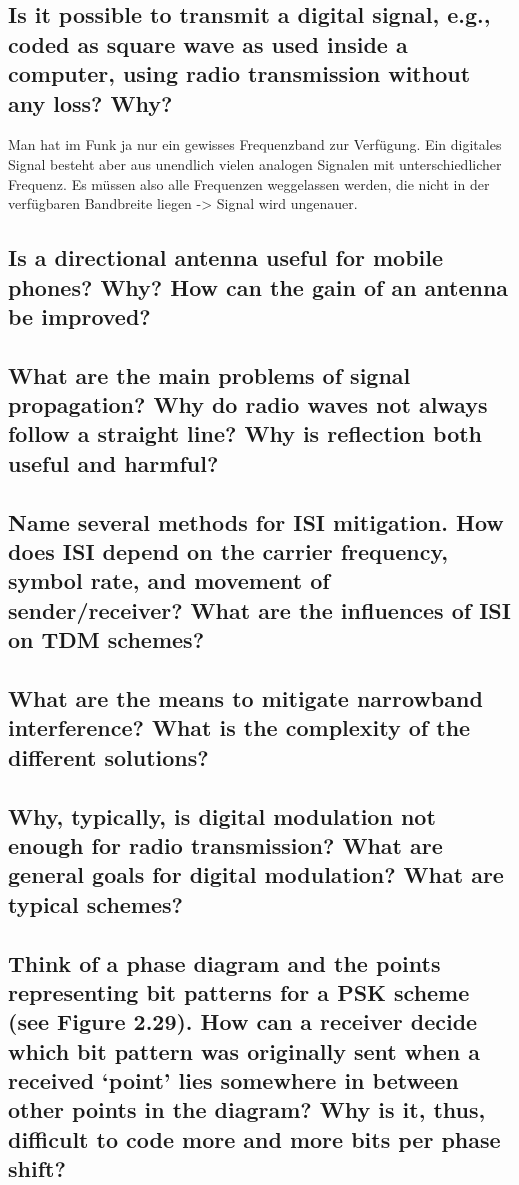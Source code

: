 \subsection{Is it possible to transmit a digital signal, e.g., coded as square wave as used inside a
computer, using radio transmission without any loss? Why?}
Man hat im Funk ja nur ein gewisses Frequenzband zur Verfügung. Ein digitales Signal besteht aber aus unendlich vielen analogen Signalen mit unterschiedlicher Frequenz. Es müssen also alle Frequenzen weggelassen werden, die nicht in der verfügbaren Bandbreite liegen -> Signal wird ungenauer.

\subsection{Is a directional antenna useful for mobile phones? Why? How can the gain of an
antenna be improved?}

\subsection{What are the main problems of signal propagation? Why do radio waves not always
follow a straight line? Why is reflection both useful and harmful?}

\subsection{Name several methods for ISI mitigation. How does ISI depend on the carrier
frequency, symbol rate, and movement of sender/receiver? What are the influences
of ISI on TDM schemes?}

\subsection{What are the means to mitigate narrowband interference? What is the complexity of
the different solutions?}

\subsection{Why, typically, is digital modulation not enough for radio transmission? What are
general goals for digital modulation? What are typical schemes?}

\subsection{Think of a phase diagram and the points representing bit patterns for a PSK scheme
(see Figure 2.29). How can a receiver decide which bit pattern was originally sent
when a received ‘point’ lies somewhere in between other points in the diagram? Why
is it, thus, difficult to code more and more bits per phase shift?}

